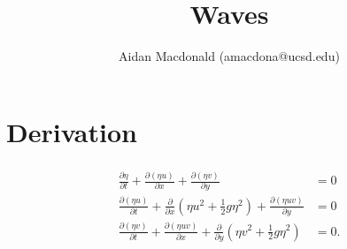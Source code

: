 \documentclass[10pt,a4paper,final]{article}
\author{Aidan Macdonald (amacdona@ucsd.edu)}
\title{Waves}
\begin{document}
\section{Derivation}

\begin{align*}
{\begin{aligned}{\frac  {\partial \eta }{\partial t}}+{\frac  {\partial (\eta u)}{\partial x}}+{\frac  {\partial (\eta v)}{\partial y}}&=0\\[3pt]{\frac  {\partial (\eta u)}{\partial t}}+{\frac  {\partial }{\partial x}}\left(\eta u^{2}+{\frac  {1}{2}}g\eta ^{2}\right)+{\frac  {\partial (\eta uv)}{\partial y}}&=0\\[3pt]{\frac  {\partial (\eta v)}{\partial t}}+{\frac  {\partial (\eta uv)}{\partial x}}+{\frac  {\partial }{\partial y}}\left(\eta v^{2}+{\frac  {1}{2}}g\eta ^{2}\right)&=0.\end{aligned}}
\end{align*}
\end{document}
